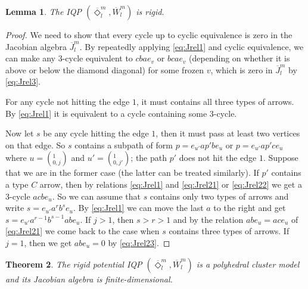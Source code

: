 \documentclass{amsart}
\newtheorem{theorem}{Theorem}[section]
\newtheorem{lemma}[theorem]{Lemma}
\theoremstyle{definition}
\theoremstyle{remark}
\numberwithin{equation}{section}
\newcommand{\br}[1]{\overline{#1}}
\begin{document}
\begin{lemma} The IQP $(\br{\Diamond}_l^m,\br{W}_l^m)$ is rigid.
\end{lemma}
\begin{proof}  %
We need to show that every cycle up to cyclic equivalence is zero in the Jacobian algebra $\br{J}_l^m$.
By repeatedly applying \eqref{eq:Jrel1} and cyclic equivalence, we can make any 3-cycle equivalent to $cbae_v$ or $bcae_v$ (depending on whether it is above or below the diamond diagonal) for some frozen $v$, which is zero in $\br{J}_l^m$ by \eqref{eq:Jrel3}.

For any cycle not hitting the edge $1$, it must contains all three types of arrows. 
By \eqref{eq:Jrel1} it is equivalent to a cycle containing some 3-cycle.

Now let $s$ be any cycle hitting the edge $1$, then it must pass at least two vertices on that edge. 
So $s$ contains a subpath of form $p=e_{u'} a p' b e_{u}$ or $p=e_{u'} ap'c e_{u}$ 
where $u=(_{0,j}^1)$ and $u'=(_{0,j'}^1)$; the path $p'$ does not hit the edge $1$.
Suppose that we are in the former case (the latter can be treated similarly).
If $p'$ contains a type $C$ arrow, then by relations \eqref{eq:Jrel1} and \eqref{eq:Jrel21} or \eqref{eq:Jrel22} we get a 3-cycle $acbe_{u}$.
So we can assume that $s$ contains only two types of arrows and write $s=e_{u'} a^r b^s e_{u}$. 
By \eqref{eq:Jrel1} we can move the last $a$ to the right and get $s=e_{u'} a^{r-1} b^{s-1} abe_{u}$.
If $j>1$, then $s>r>1$ and by the relation $abe_u=ace_u$ of \eqref{eq:Jrel21}
we come back to the case when $s$ contains three types of arrows.
If $j=1$, then we get $abe_u=0$ by \eqref{eq:Jrel23}. 
\end{proof}



\begin{theorem} \label{T:CM} The rigid potential IQP $(\br{\Diamond}_l^m,\br{W}_l^m)$ is a polyhedral cluster model and its Jacobian algebra is finite-dimensional.
\end{theorem}
\end{document}
